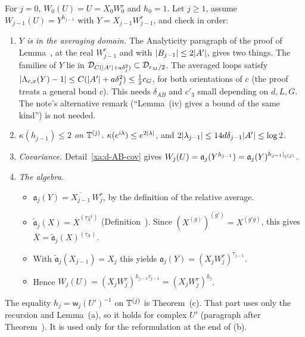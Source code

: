 \begin{detail}
\begin{step}
For $j=0$, $W_0(U)=U=X_0W^r_0$ and $h_0=1$. Let $j\ge1$, assume $W_{j-1}(U)=Y^{h_{j-1}}$ with $Y=X_{j-1}W^r_{j-1}$, and check in order:
\begin{enumerate}[label=(\roman*)]
\item \emph{$Y$ is in the averaging domain.} The Analyticity paragraph of the proof of Lemma~, at the real $W^r_{j-1}$ and with $\lvert B_{j-1}\rvert\le2\lvert A'\rvert$, gives two things. The families of $Y$ lie in $\mathcal D_{C(\lvert A'\rvert+a\delta_j^2)}\subset\mathcal D_{r_M/2}$. The averaged loops satisfy $\lvert\Lambda_{c,x}(Y)-1\rvert\le C(\lvert A'\rvert+a\delta_j^2)\le\frac12c_G$, for both orientations of $c$ (the proof treats a general bond $c$). This needs $\delta_{AB}$ and $c'_3$ small depending on $d,L,G$. The note's alternative remark (``Lemma~(iv) gives a bound of the same kind'') is not needed.
\item \emph{$\kappa(h_{j-1})\le2$ on $\mathbb T^{(j)}$.} $\kappa(e^{\mathrm i\lambda})\le e^{2\lvert\lambda\rvert}$, and $2\lvert\lambda_{j-1}\rvert\le14d\delta_{j-1}\lvert A'\rvert\le\log2$.
\item \emph{Covariance.} Detail~\ref{xa:d-AB-cov} gives $W_j(U)=\mathfrak a_j(Y^{h_{j-1}})=\mathfrak a_j(Y)^{h_{j-1}|_{\mathbb T^{(j)}}}$.
\item \emph{The algebra.}
  \begin{itemize}
  \item $\mathfrak a_j(Y)=\overline{X_{j-1}}\,W^r_j$, by the definition of the relative average.
  \item $\tilde{\mathfrak a}_j(X)=\overline X^{(\tau_X^{-1})}$ (Definition~). Since $(X^{(g)})^{(g')}=X^{(g'g)}$, this gives $\overline X=\tilde{\mathfrak a}_j(X)^{(\tau_X)}$.
  \item With $\tilde{\mathfrak a}_j(X_{j-1})=X_j$ this yields $\mathfrak a_j(Y)=(X_jW^r_j)^{\tau_{j-1}}$.
  \item Hence $W_j(U)=(X_jW^r_j)^{h_{j-1}\tau_{j-1}}=(X_jW^r_j)^{h_j}$.
  \end{itemize}
\end{enumerate}
The equality $h_j=\mathsf w_j(U')^{-1}$ on $\mathbb T^{(j)}$ is Theorem~(c). That part uses only the recursion and Lemma~(a), so it holds for complex $U'$ (paragraph after Theorem~). It is used only for the reformulation at the end of (b).
\end{step}
\end{detail}

